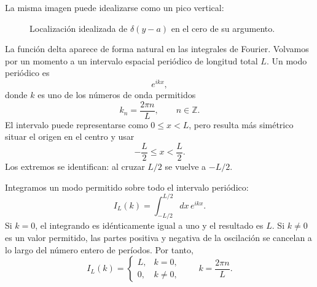 La misma imagen puede idealizarse como un pico vertical:
\begin{figure}[h]\centering
{}\caption{Localización idealizada de \(\delta(y-a)\) en el cero de su argumento.}\end{figure}

La función delta aparece de forma natural en las integrales de Fourier. Volvamos por un momento a un intervalo espacial periódico de longitud total \(L\). Un modo periódico es
\begin{equation}
e^{ikx},
\end{equation}
donde \(k\) es uno de los números de onda permitidos
\begin{equation}
k_n=\frac{2\pi n}{L},
\qquad n\in\mathbb Z.
\end{equation}
El intervalo puede representarse como \(0\leq x<L\), pero resulta más simétrico situar el origen en el centro y usar
\begin{equation}
-\frac L2\leq x<\frac L2.
\end{equation}
Los extremos se identifican: al cruzar \(L/2\) se vuelve a \(-L/2\).

Integramos un modo permitido sobre todo el intervalo periódico:
\begin{equation}
I_L(k)=\int_{-L/2}^{L/2}dx\,e^{ikx}.
\end{equation}
Si \(k=0\), el integrando es idénticamente igual a uno y el resultado es \(L\). Si \(k\neq0\) es un valor permitido, las partes positiva y negativa de la oscilación se cancelan a lo largo del número entero de períodos. Por tanto,
\begin{equation}
I_L(k)=
\begin{cases}
L,&k=0,\\[4pt]
0,&k\neq0,
\end{cases}
\qquad
k=\frac{2\pi n}{L}.
\end{equation}

